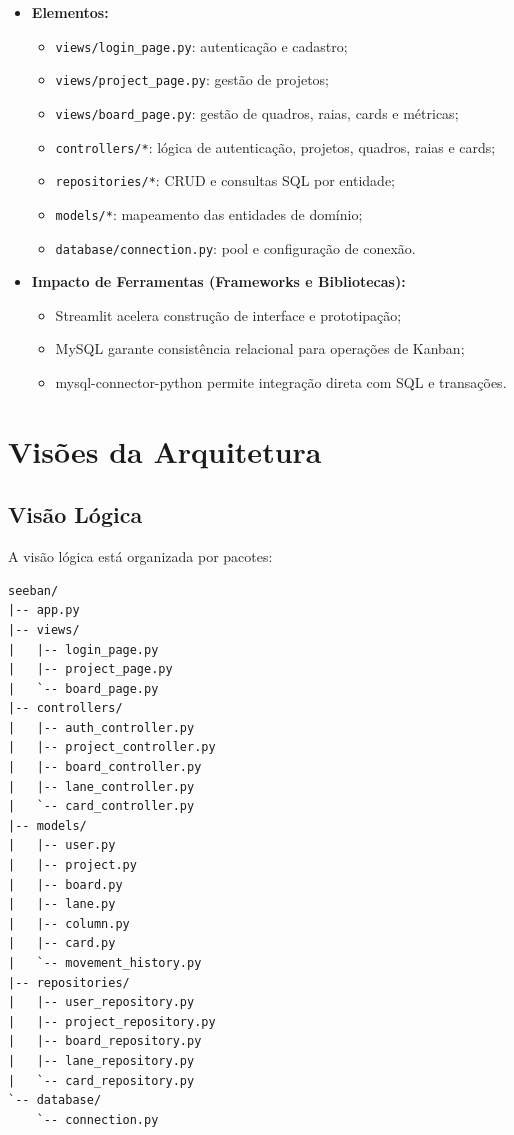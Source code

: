 \begin{itemize}
    \item \textbf{Elementos:}
    \begin{itemize}
        \item \texttt{views/login\_page.py}: autenticação e cadastro;
        \item \texttt{views/project\_page.py}: gestão de projetos;
        \item \texttt{views/board\_page.py}: gestão de quadros, raias, cards e métricas;
        \item \texttt{controllers/*}: lógica de autenticação, projetos, quadros, raias e cards;
        \item \texttt{repositories/*}: CRUD e consultas SQL por entidade;
        \item \texttt{models/*}: mapeamento das entidades de domínio;
        \item \texttt{database/connection.py}: pool e configuração de conexão.
    \end{itemize}
    \item \textbf{Impacto de Ferramentas (Frameworks e Bibliotecas):}
    \begin{itemize}
        \item Streamlit acelera construção de interface e prototipação;
        \item MySQL garante consistência relacional para operações de Kanban;
        \item mysql-connector-python permite integração direta com SQL e transações.
    \end{itemize}
\end{itemize}

\section{Visões da Arquitetura}
\subsection{Visão Lógica}
A visão lógica está organizada por pacotes:

\begin{verbatim}
seeban/
|-- app.py
|-- views/
|   |-- login_page.py
|   |-- project_page.py
|   `-- board_page.py
|-- controllers/
|   |-- auth_controller.py
|   |-- project_controller.py
|   |-- board_controller.py
|   |-- lane_controller.py
|   `-- card_controller.py
|-- models/
|   |-- user.py
|   |-- project.py
|   |-- board.py
|   |-- lane.py
|   |-- column.py
|   |-- card.py
|   `-- movement_history.py
|-- repositories/
|   |-- user_repository.py
|   |-- project_repository.py
|   |-- board_repository.py
|   |-- lane_repository.py
|   `-- card_repository.py
`-- database/
    `-- connection.py
\end{verbatim}

